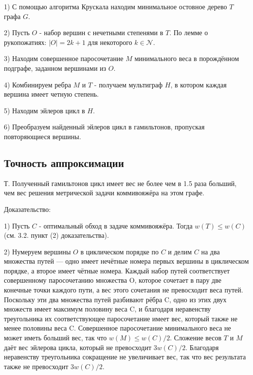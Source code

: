 \documentclass[a4paper,12pt]{article}
\begin{document}
1) С помощью алгоритма Крускала находим минимальное остовное дерево $T$ графа $G$.

2) Пусть $O$ - набор вершин с нечетными степенями в $T$. По лемме о рукопожатиях: $|O| = 2k + 1$ для некоторого $k \in \mathscr{N}$.

3) Находим совершенное паросочетание $M$ минимального веса в порождённом подграфе, заданном вершинами из $O$.

4) Комбинируем ребра $M$ и $T$ - получаем мультиграф $H$, в котором каждая вершина имеет четную степень.

5) Находим эйлеров цикл в $H$.

6) Преобразуем найденный эйлеров цикл в гамильтонов, пропуская повторяющиеся вершины.

\subsection{Точность аппроксимации}

Т. Полученный гамильтонов цикл имеет вес не более чем в 1.5 раза больший, чем вес решения метрической задачи коммивояжёра на этом графе.

Доказательство: 

1) Пусть $C$ - оптимальный обход в задаче коммивояжёра. Тогда $w(T) \leq w(C)$ (см. 3.2. пункт (2) доказательства).

2) Нумеруем вершины $O$ в циклическом порядке по $C$ и делим  $C$ на два множества путей — одно имеет нечётные номера первых вершины в циклическом порядке, а второе имеет чётные номера. Каждый набор путей соответствует совершенному паросочетанию множества O, которое сочетает в пару две конечные точки каждого пути, а вес этого сочетания не превосходит веса путей. Поскольку эти два множества путей разбивают рёбра C, одно из этих двух множеств имеет максимум половину веса C, и благодаря неравенству треугольника их соответствующее паросочетание имеет вес, который также не менее половины веса C. Совершенное паросочетание минимального веса не может иметь больший вес, так что $w(M) \leq w(C)/2$. Сложение весов $T$ и $M$ даёт вес эйлерова цикла, который не превосходит $3w(C)/2$. Благодаря неравенству треугольника сокращение не увеличивает вес, так что вес результата также не превосходит $3w(C)/2$.
\end{document}
